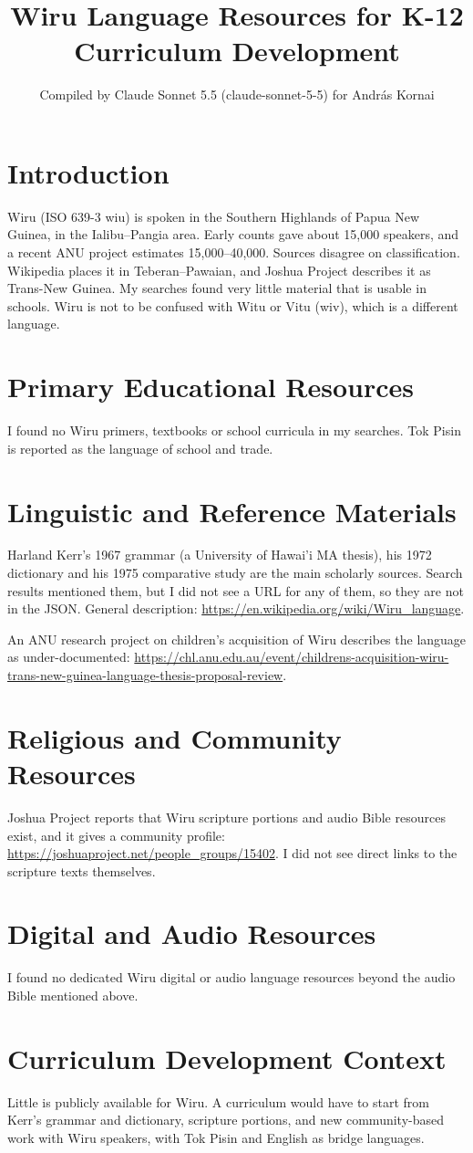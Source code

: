 \documentclass[12pt]{article}
\title{Wiru Language Resources for K-12 Curriculum Development}
\author{Compiled by Claude Sonnet 5.5 (claude-sonnet-5-5) for Andr\'as Kornai}
\date{}
\begin{document}
\maketitle

\section{Introduction}
Wiru (ISO 639-3 wiu) is spoken in the Southern Highlands of Papua New Guinea, in the Ialibu--Pangia area. Early counts gave about 15,000 speakers, and a recent ANU project estimates 15,000--40,000. Sources disagree on classification. Wikipedia places it in Teberan--Pawaian, and Joshua Project describes it as Trans-New Guinea. My searches found very little material that is usable in schools. Wiru is not to be confused with Witu or Vitu (wiv), which is a different language.

\section{Primary Educational Resources}
I found no Wiru primers, textbooks or school curricula in my searches. Tok Pisin is reported as the language of school and trade.

\section{Linguistic and Reference Materials}
Harland Kerr's 1967 grammar (a University of Hawai'i MA thesis), his 1972 dictionary and his 1975 comparative study are the main scholarly sources. Search results mentioned them, but I did not see a URL for any of them, so they are not in the JSON. General description: \url{https://en.wikipedia.org/wiki/Wiru_language}.

An ANU research project on children's acquisition of Wiru describes the language as under-documented: \url{https://chl.anu.edu.au/event/childrens-acquisition-wiru-trans-new-guinea-language-thesis-proposal-review}.

\section{Religious and Community Resources}
Joshua Project reports that Wiru scripture portions and audio Bible resources exist, and it gives a community profile: \url{https://joshuaproject.net/people_groups/15402}. I did not see direct links to the scripture texts themselves.

\section{Digital and Audio Resources}
I found no dedicated Wiru digital or audio language resources beyond the audio Bible mentioned above.

\section{Curriculum Development Context}
Little is publicly available for Wiru. A curriculum would have to start from Kerr's grammar and dictionary, scripture portions, and new community-based work with Wiru speakers, with Tok Pisin and English as bridge languages.
\end{document}
